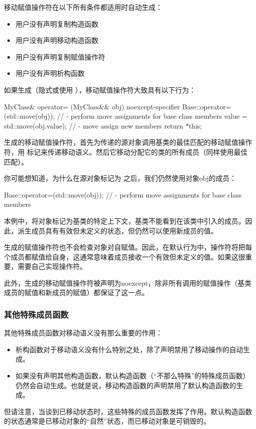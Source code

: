 移动赋值操作符在以下所有条件都适用时自动生成：

\begin{itemize}
	\item 用户没有声明复制构造函数
	\item 用户没有声明移动构造函数
	\item 用户没有声明复制赋值操作符
	\item 用户没有声明析构函数
\end{itemize}

如果生成（隐式或使用 ），移动赋值操作符大致具有以下行为：

\begin{cppcode}
MyClass& operator= (MyClass&& obj) noexcept-specifier {
	Base::operator=(std::move(obj)); // - perform move assignments for base class members
	value = std::move(obj.value); // - move assign new members
	return *this;
}
\end{cppcode}

生成的移动赋值操作符，首先为传递的源对象调用基类的最佳匹配的移动赋值操作符，用  标记来传递移动语义。然后它移动分配它的类的所有成员（同样使用最佳匹配）。

你可能想知道，为什么在源对象标记为  之后，我们仍然使用对象obj的成员：

\begin{cppcode}
Base::operator=(std::move(obj)); // - perform move assignments for base class members
\end{cppcode}

本例中，将对象标记为基类的特定上下文，基类不能看到在该类中引入的成员。因此，派生成员具有有效但未定义的状态，但仍然可以使用新成员的值。

生成的赋值操作符也不会检查对象对自赋值。因此，在默认行为中，操作符将把每个成员都赋值给自身，这通常意味着成员接收一个有效但未定义的值。如果这很重要，需要自己实现操作符。

此外，生成的移动赋值操作符被声明为noexcept，除非所有调用的赋值操作（基类成员的赋值和新成员的赋值）都保证了这一点。

\subsubsection{其他特殊成员函数}

其他特殊成员函数对移动语义没有那么重要的作用：

\begin{itemize}
	\item 析构函数对于移动语义没有什么特别之处，除了声明禁用了移动操作的自动生成。
	\item 如果没有声明其他构造函数，默认构造函数（“不那么特殊”的特殊成员函数）仍然会自动生成。也就是说，移动构造函数的声明禁用了默认构造函数的生成。
\end{itemize}

但请注意，当谈到已移动状态时，这些特殊的成员函数发挥了作用。默认构造函数的状态通常是已移动对象的“自然”状态，而已移动对象是可销毁的。
















